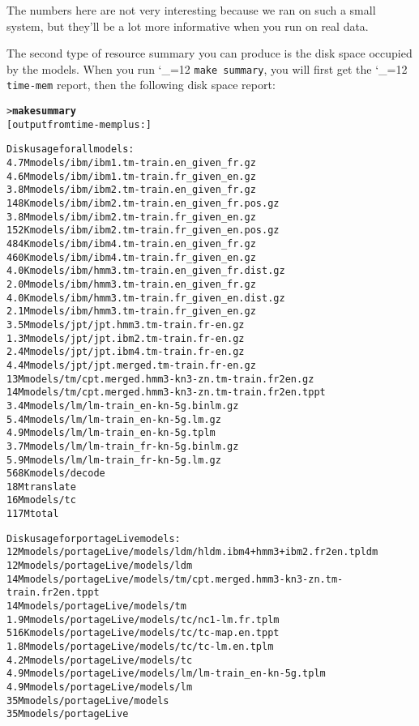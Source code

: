 \documentclass[11pt,letterpaper]{article}
\def\code{\begingroup\catcode`\_=12 \codex}
\newcommand{\codex}[1]{\texttt{#1}\endgroup}
\begin{document}
The numbers here are not very interesting because we ran on such a small
system, but they'll be a lot more informative when you run on real data.

The second type of resource summary you can produce is the disk space occupied
by the models.  When you run \code{make summary}, you will first get the
\code{time-mem} report, then the following disk space report:
\begin{small}
\begin{alltt}
   > \textbf{make summary}
   [output from time-mem plus:]

   Disk usage for all models:
   4.7M    models/ibm/ibm1.tm-train.en_given_fr.gz
   4.6M    models/ibm/ibm1.tm-train.fr_given_en.gz
   3.8M    models/ibm/ibm2.tm-train.en_given_fr.gz
   148K    models/ibm/ibm2.tm-train.en_given_fr.pos.gz
   3.8M    models/ibm/ibm2.tm-train.fr_given_en.gz
   152K    models/ibm/ibm2.tm-train.fr_given_en.pos.gz
   484K    models/ibm/ibm4.tm-train.en_given_fr.gz
   460K    models/ibm/ibm4.tm-train.fr_given_en.gz
   4.0K    models/ibm/hmm3.tm-train.en_given_fr.dist.gz
   2.0M    models/ibm/hmm3.tm-train.en_given_fr.gz
   4.0K    models/ibm/hmm3.tm-train.fr_given_en.dist.gz
   2.1M    models/ibm/hmm3.tm-train.fr_given_en.gz
   3.5M    models/jpt/jpt.hmm3.tm-train.fr-en.gz
   1.3M    models/jpt/jpt.ibm2.tm-train.fr-en.gz
   2.4M    models/jpt/jpt.ibm4.tm-train.fr-en.gz
   4.4M    models/jpt/jpt.merged.tm-train.fr-en.gz
   13M     models/tm/cpt.merged.hmm3-kn3-zn.tm-train.fr2en.gz
   14M     models/tm/cpt.merged.hmm3-kn3-zn.tm-train.fr2en.tppt
   3.4M    models/lm/lm-train_en-kn-5g.binlm.gz
   5.4M    models/lm/lm-train_en-kn-5g.lm.gz
   4.9M    models/lm/lm-train_en-kn-5g.tplm
   3.7M    models/lm/lm-train_fr-kn-5g.binlm.gz
   5.9M    models/lm/lm-train_fr-kn-5g.lm.gz
   568K    models/decode
   18M     translate
   16M     models/tc
   117M    total

   Disk usage for portageLive models:
   12M     models/portageLive/models/ldm/hldm.ibm4+hmm3+ibm2.fr2en.tpldm
   12M     models/portageLive/models/ldm
   14M     models/portageLive/models/tm/cpt.merged.hmm3-kn3-zn.tm-train.fr2en.tppt
   14M     models/portageLive/models/tm
   1.9M    models/portageLive/models/tc/nc1-lm.fr.tplm
   516K    models/portageLive/models/tc/tc-map.en.tppt
   1.8M    models/portageLive/models/tc/tc-lm.en.tplm
   4.2M    models/portageLive/models/tc
   4.9M    models/portageLive/models/lm/lm-train_en-kn-5g.tplm
   4.9M    models/portageLive/models/lm
   35M     models/portageLive/models
   35M     models/portageLive
\end{alltt}
\end{small}
\end{document}
